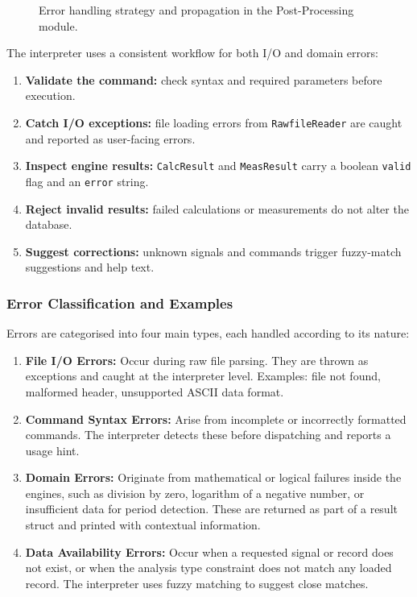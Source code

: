 \begin{figure}[H]
{
    }
    \caption{Error handling strategy and propagation in the Post-Processing module.}
    \label{fig:error_handling_strategy}
\end{figure}

The interpreter uses a consistent workflow for both I/O and domain errors:
\begin{enumerate}
    \item \textbf{Validate the command:} check syntax and required parameters before execution.
    \item \textbf{Catch I/O exceptions:} file loading errors from \texttt{RawfileReader} are caught and reported as user-facing errors.
    \item \textbf{Inspect engine results:} \texttt{CalcResult} and \texttt{MeasResult} carry a boolean \texttt{valid} flag and an \texttt{error} string.
    \item \textbf{Reject invalid results:} failed calculations or measurements do not alter the database.
    \item \textbf{Suggest corrections:} unknown signals and commands trigger fuzzy-match suggestions and help text.
\end{enumerate}

\subsubsection{Error Classification and Examples}

Errors are categorised into four main types, each handled according to its nature:

\begin{enumerate}
  \item \textbf{File I/O Errors:} Occur during raw file parsing. They are thrown as exceptions and caught at the interpreter level. Examples: file not found, malformed header, unsupported ASCII data format.
  \item \textbf{Command Syntax Errors:} Arise from incomplete or incorrectly formatted commands. The interpreter detects these before dispatching and reports a usage hint.
  \item \textbf{Domain Errors:} Originate from mathematical or logical failures inside the engines, such as division by zero, logarithm of a negative number, or insufficient data for period detection. These are returned as part of a result struct and printed with contextual information.
  \item \textbf{Data Availability Errors:} Occur when a requested signal or record does not exist, or when the analysis type constraint does not match any loaded record. The interpreter uses fuzzy matching to suggest close matches.
\end{enumerate}

